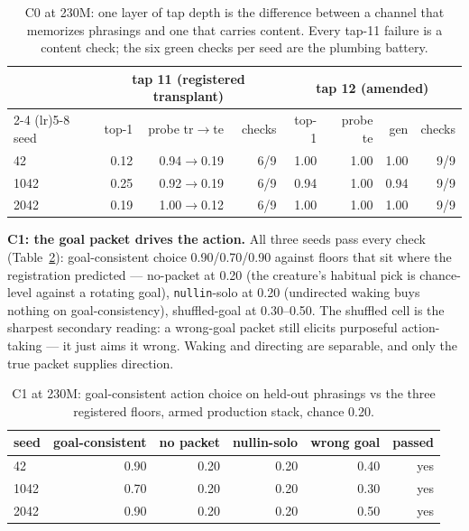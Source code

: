 \documentclass[11pt]{article}
\begin{document}
\begin{table}[t]
\centering
\small
\setlength{\tabcolsep}{5pt}
\begin{tabular}{lrrrrrrr}
\toprule
& \multicolumn{3}{c}{tap 11 (registered transplant)} & \multicolumn{4}{c}{tap 12 (amended)} \\
\cmidrule(lr){2-4} \cmidrule(lr){5-8}
seed & top-1 & probe tr$\to$te & checks & top-1 & probe te & gen & checks \\
\midrule
42 & 0.12 & 0.94$\to$0.19 & 6/9 & 1.00 & 1.00 & 1.00 & 9/9 \\
1042 & 0.25 & 0.92$\to$0.19 & 6/9 & 0.94 & 1.00 & 0.94 & 9/9 \\
2042 & 0.19 & 1.00$\to$0.12 & 6/9 & 1.00 & 1.00 & 1.00 & 9/9 \\
\bottomrule
\end{tabular}
\caption{C0 at 230M: one layer of tap depth is the difference between a
channel that memorizes phrasings and one that carries content. Every
tap-11 failure is a content check; the six green checks per seed are the
plumbing battery.}
\label{tab:c0}
\end{table}

\textbf{C1: the goal packet drives the action.} All three seeds pass
every check (Table~\ref{tab:c1}): goal-consistent choice 0.90/0.70/0.90
against floors that sit where the registration predicted --- no-packet
at 0.20 (the creature's habitual pick is chance-level against a rotating
goal), \texttt{nullin}-solo at 0.20 (undirected waking buys nothing on
goal-consistency), shuffled-goal at 0.30--0.50. The shuffled cell is
the sharpest secondary reading: a wrong-goal packet still elicits
purposeful action-taking --- it just aims it wrong. Waking and directing
are separable, and only the true packet supplies direction.

\begin{table}[t]
\centering
\small
\begin{tabular}{lrrrrr}
\toprule
seed & goal-consistent & no packet & nullin-solo & wrong goal & passed \\
\midrule
42 & 0.90 & 0.20 & 0.20 & 0.40 & yes \\
1042 & 0.70 & 0.20 & 0.20 & 0.30 & yes \\
2042 & 0.90 & 0.20 & 0.20 & 0.50 & yes \\
\bottomrule
\end{tabular}
\caption{C1 at 230M: goal-consistent action choice on held-out
phrasings vs the three registered floors, armed production stack,
chance 0.20.}
\label{tab:c1}
\end{table}
\end{document}
